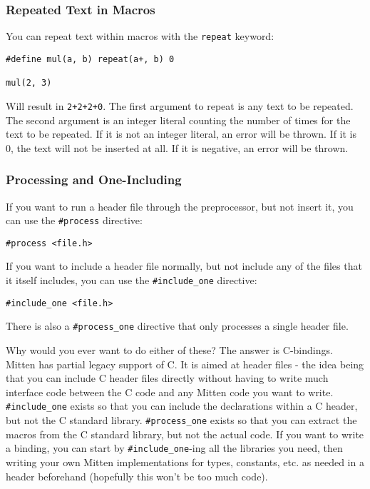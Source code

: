 \documentclass[10pt,a4paper]{article}
\begin{document}
\subsubsection{Repeated Text in Macros}
You can repeat text within macros with the \verb|repeat| keyword:
\begin{verbatim}
#define mul(a, b) repeat(a+, b) 0

mul(2, 3)
\end{verbatim}

Will result in \verb|2+2+2+0|. The first argument to repeat is any text to be repeated. The second argument is an integer literal counting the number of times for the text to be repeated. If it is not an integer literal, an error will be thrown. If it is 0, the text will not be inserted at all. If it is negative, an error will be thrown.

\newpage





\subsubsection{Processing and One-Including}
If you want to run a header file through the preprocessor, but not insert it, you can use the \verb|#process| directive:
\begin{verbatim}
#process <file.h>
\end{verbatim}

If you want to include a header file normally, but not include any of the files that it itself includes, you can use the \verb|#include_one| directive:
\begin{verbatim}
#include_one <file.h>
\end{verbatim}

There is also a \verb|#process_one| directive that only processes a single header file.

Why would you ever want to do either of these? The answer is C-bindings. Mitten has partial legacy support of C. It is aimed at header files - the idea being that you can include C header files directly without having to write much interface code between the C code and any Mitten code you want to write. \verb|#include_one| exists so that you can include the declarations within a C header, but not the C standard library. \verb|#process_one| exists so that you can extract the macros from the C standard library, but not the actual code. If you want to write a binding, you can start by \verb|#include_one|-ing all the libraries you need, then writing your own Mitten implementations for types, constants, etc. as needed in a header beforehand (hopefully this won't be too much code). 
\end{document}
